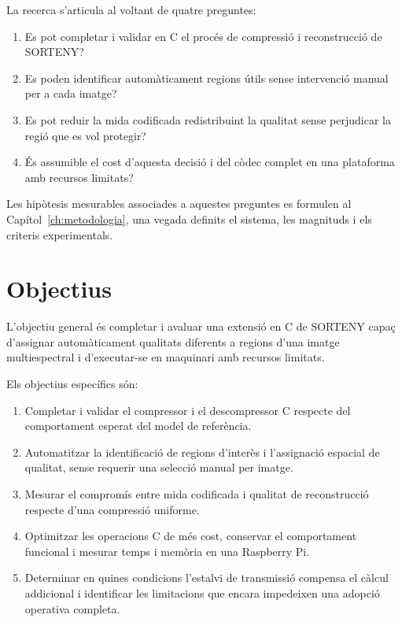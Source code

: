 La recerca s'articula al voltant de quatre preguntes:

\begin{enumerate}[label=\textbf{P\arabic*.},leftmargin=*]
  \item Es pot completar i validar en C el procés de compressió i reconstrucció
  de SORTENY?
  \item Es poden identificar automàticament regions útils sense intervenció
  manual per a cada imatge?
  \item Es pot reduir la mida codificada redistribuint la qualitat sense
  perjudicar la regió que es vol protegir?
  \item És assumible el cost d'aquesta decisió i del còdec complet en una
  plataforma amb recursos limitats?
\end{enumerate}

Les hipòtesis mesurables associades a aquestes preguntes es formulen al
Capítol~\ref{ch:metodologia}, una vegada definits el sistema, les magnituds i
els criteris experimentals.

\section{Objectius}\label{sec:objectius}

L'objectiu general és completar i avaluar una extensió en C de SORTENY capaç
d'assignar automàticament qualitats diferents a regions d'una imatge
multiespectral i d'executar-se en maquinari amb recursos limitats.

Els objectius específics són:

\begin{enumerate}[label=\textbf{O\arabic*.},leftmargin=*]
  \item Completar i validar el compressor i el descompressor C respecte del
  comportament esperat del model de referència.
  \item Automatitzar la identificació de regions d'interès i l'assignació
  espacial de qualitat, sense requerir una selecció manual per imatge.
  \item Mesurar el compromís entre mida codificada i qualitat de reconstrucció
  respecte d'una compressió uniforme.
  \item Optimitzar les operacions C de més cost, conservar el comportament
  funcional i mesurar temps i memòria en una Raspberry Pi.
  \item Determinar en quines condicions l'estalvi de transmissió compensa el
  càlcul addicional i identificar les limitacions que encara impedeixen una
  adopció operativa completa.
\end{enumerate}

